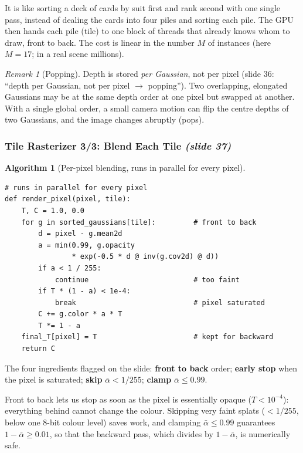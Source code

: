 \documentclass[11pt,a4paper]{article}
\newcommand{\abar}{\bar\alpha}
\newcommand{\sr}[1]{\texorpdfstring{\emph{(#1)}}{(#1)}}
\theoremstyle{definition}
\theoremstyle{algstyle}
\newtheorem{algorithm}[definition]{Algorithm}
\theoremstyle{plain}
\theoremstyle{remark}
\newtheorem{remark}[definition]{Remark}
\begin{document}
\begin{intuition}
It is like sorting a deck of cards by suit first and rank second with one single pass, instead of dealing the cards into four piles and sorting each pile. The GPU then hands each pile (tile) to one block of threads that already knows whom to draw, front to back. The cost is linear in the number $M$ of instances (here $M=17$; in a real scene millions).
\end{intuition}

\begin{remark}[Popping]
Depth is stored \emph{per Gaussian}, not per pixel (slide 36: ``depth per Gaussian, not per pixel $\to$ popping''). Two overlapping, elongated Gaussians may be at the same depth order at one pixel but swapped at another. With a single global order, a small camera motion can flip the centre depths of two Gaussians, and the image changes abruptly (pops).
\end{remark}

\subsubsection{Tile Rasterizer 3/3: Blend Each Tile \sr{slide 37}}
\begin{algorithm}[Per-pixel blending, runs in parallel for every pixel]
\begin{lstlisting}
# runs in parallel for every pixel
def render_pixel(pixel, tile):
    T, C = 1.0, 0.0
    for g in sorted_gaussians[tile]:         # front to back
        d = pixel - g.mean2d
        a = min(0.99, g.opacity
                * exp(-0.5 * d @ inv(g.cov2d) @ d))
        if a < 1 / 255:
            continue                         # too faint
        if T * (1 - a) < 1e-4:
            break                            # pixel saturated
        C += g.color * a * T
        T *= 1 - a
    final_T[pixel] = T                       # kept for backward
    return C
\end{lstlisting}
\end{algorithm}
The four ingredients flagged on the slide: \textbf{front to back} order; \textbf{early stop} when the pixel is saturated; \textbf{skip} $\abar<1/255$; \textbf{clamp} $\abar\le0.99$.

\begin{intuition}
Front to back lets us stop as soon as the pixel is essentially opaque ($T<10^{-4}$): everything behind cannot change the colour. Skipping very faint splats ($<1/255$, below one 8-bit colour level) saves work, and clamping $\abar\le0.99$ guarantees $1-\abar\ge0.01$, so that the backward pass, which divides by $1-\abar$, is numerically safe.
\end{intuition}
\end{document}
